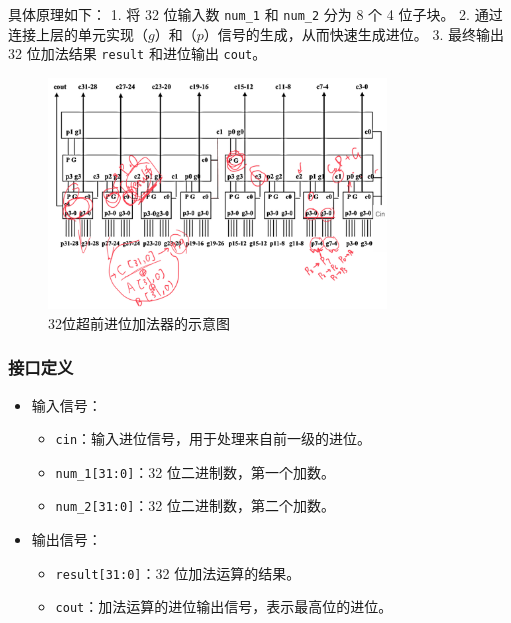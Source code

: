\documentclass[zihao=5, UTF8]{article}
\theoremstyle{MyLineTheoremStyle} %
\theoremstyle{MyBlockTheoremStyle} %
\theoremstyle{MySubsubsectionStyle} %
\begin{document}
具体原理如下：
1. 将 32 位输入数 \texttt{num\_1} 和 \texttt{num\_2} 分为 8 个 4 位子块。
2. 通过连接上层的单元实现（$g$）和（$p$）信号的生成，从而快速生成进位。
3. 最终输出 32 位加法结果 \texttt{result} 和进位输出 \texttt{cout}。

\begin{figure}[htbp]
    \centering
    \includegraphics[width=0.8\textwidth]{三十二位超前进位加法器.png}
    \caption{32位超前进位加法器的示意图}
    \label{fig:cla32}
\end{figure}

\subsubsection{接口定义}
\begin{itemize}
    \item 输入信号：
    \begin{itemize}
        \item \texttt{cin}：输入进位信号，用于处理来自前一级的进位。
        \item \texttt{num\_1[31:0]}：32 位二进制数，第一个加数。
        \item \texttt{num\_2[31:0]}：32 位二进制数，第二个加数。
    \end{itemize}
    \item 输出信号：
    \begin{itemize}
        \item \texttt{result[31:0]}：32 位加法运算的结果。
        \item \texttt{cout}：加法运算的进位输出信号，表示最高位的进位。
    \end{itemize}
\end{itemize}
\end{document}
